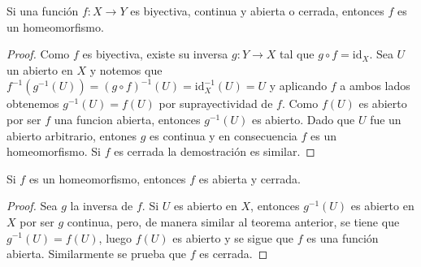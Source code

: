 

\begin{theorem}
Si una función $f : X \longrightarrow Y$ es biyectiva, continua y abierta o cerrada, entonces $f$ es un homeomorfismo.
\end{theorem}

\begin{proof}
Como $f$ es biyectiva, existe su inversa $g : Y \longrightarrow X$ tal que $g \circ f = \text{id}_X$. Sea $U$ un abierto en $X$ y notemos que $f^{-1}(g^{-1}(U)) = (g \circ f)^{-1}(U) = \text{id}_X^{-1}(U) = U$ y aplicando $f$ a ambos lados obtenemos $g^{-1}(U) = f(U)$ por suprayectividad de $f$. Como $f(U)$ es abierto por ser $f$ una funcion abierta, entonces $g^{-1}(U)$ es abierto. Dado que $U$ fue un abierto arbitrario, entones $g$ es continua y en consecuencia $f$ es un homeomorfismo. Si $f$ es cerrada la demostración es similar.
\end{proof}

\begin{theorem}
Si $f$ es un homeomorfismo, entonces $f$ es abierta y cerrada.
\end{theorem}

\begin{proof}
Sea $g$ la inversa de $f$. Si $U$ es abierto en $X$, entonces $g^{-1}(U)$ es abierto en $X$ por ser $g$ continua, pero, de manera similar al teorema anterior, se tiene que $g^{-1}(U) = f(U)$, luego $f(U)$ es abierto y se sigue que $f$ es una función abierta. Similarmente se prueba que $f$ es cerrada.
\end{proof}
